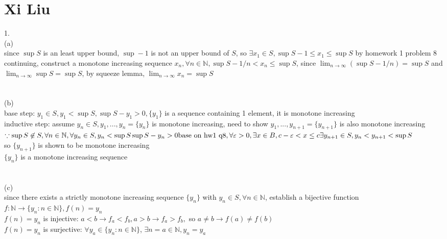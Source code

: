 \documentclass[12pt, border = 4pt, multi]{article} %
\begin{document}
\section*{Xi Liu}
1.\\
(a)\\
since $\sup S$ is an least upper bound, $\sup - 1$ is not an upper bound of $S$, so $\exists x_1 \in S, \sup S - 1 \leq x_1 \leq \sup S$ by homework 1 problem 8\\
continuing, construct a monotone increasing sequence $x_n, \forall n \in \mathbb{N}, \sup S - 1 / n < x_n \leq \sup S$, since $\lim_{n \rightarrow \infty} (\sup S - 1 / n) = \sup S$ and $\lim_{n \rightarrow \infty} \sup S = \sup S$, by squeeze lemma, $\lim_{n \rightarrow \infty} x_n = \sup S$\\
\\
\\
(b)\\
base step: $y_1 \in S, y_1 < \sup S, \sup S - y_1 > 0, \{y_1\}$ is a sequence containing 1 element, it is monotone increasing\\
inductive step: assume $y_n \in S, y_1, ..., y_n = \{y_n\}$ is monotone increasing, need to show $y_1, ..., y_{n + 1} = \{y_{n + 1}\}$ is also monotone increasing\\
$\because \sup S \not\in S, \forall n \in \mathbb{N}, \forall y_n \in S, y_n < \sup S\\
\sup S - y_n > 0\\
\text{base on hw1 q8}, \forall \varepsilon > 0, \exists x \in B, c - \varepsilon < x \leq c\\
\exists y_{n + 1} \in S, y_n < y_{n + 1} < \sup S$\\
so $\{y_{n + 1}\}$ is shown to be monotone increasing\\
$\{y_n\}$ is a monotone increasing sequence\\
\\
\\
(c)\\
since there exists a strictly monotone increasing sequence $\{y_n\}$ with $y_n \in S, \forall n \in \mathbb{N}$, establish a bijective function $f: \mathbb{N} \rightarrow \{y_n : n \in \mathbb{N}\}, f(n) = y_n$\\
$f(n) = y_n$ is injective: $a < b \rightarrow f_a < f_b, a > b \rightarrow f_a > f_b,$ so $a \not= b \rightarrow f(a) \not= f(b)$\\
$f(n) = y_n$ is surjective: $\forall y_a \in \{y_n: n \in \mathbb{N}\}$, $\exists n = a \in \mathbb{N}, y_n = y_a$\\
\end{document}
